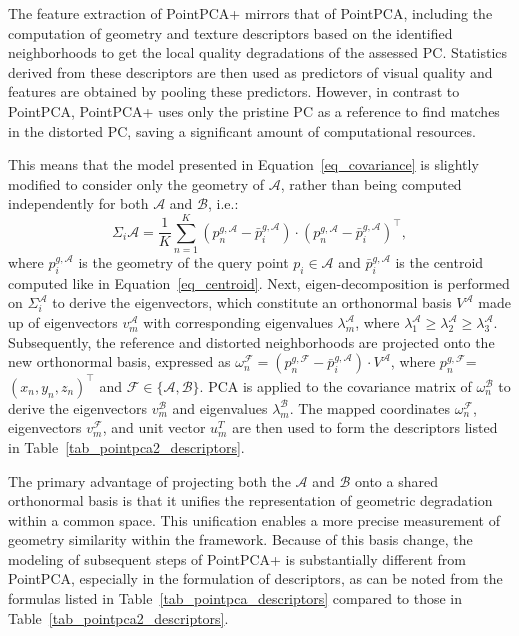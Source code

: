 \documentclass[final,3p,times,twocolumn]{elsarticle}
\begin{document}
The feature extraction of PointPCA+ mirrors that of PointPCA, including the computation of geometry and texture descriptors based on the identified neighborhoods to get the local quality degradations of the assessed \gls{PC}. Statistics derived from these descriptors are then used as predictors of visual quality and features are obtained by pooling these predictors. However, in contrast to PointPCA, PointPCA+ uses only the pristine \gls{PC} as a reference to find matches in the distorted \gls{PC}, saving a significant amount of computational resources. 

This means that the model presented in Equation~\ref{eq_covariance} is slightly modified to consider only the geometry of $\mathcal{A}$, rather than being computed independently for both $\mathcal{A}$ and $\mathcal{B}$, i.e.:
\begin{equation} \label{eq_covariance_pointpca2}
    \Sigma_i\mathcal{A} = \frac{1}{K} \sum_{n=1}^{K} \left( p_{n}^{g,\mathcal{A}} - \bar{p}_{i}^{g,\mathcal{A}} \right) \cdot \left( p_{n}^{g,\mathcal{A}} - \bar{p}_{i}^{g,\mathcal{A}} \right)^\top,
\end{equation}
where $p_{i}^{g,\mathcal{A}}$ is the geometry of the query point $p_i \in \mathcal{A}$ and $\bar{p}_{i}^{g,\mathcal{A}}$ is the centroid computed like in Equation~\ref{eq_centroid}.  Next, eigen-decomposition is performed on $\Sigma_i^\mathcal{A}$ to derive the eigenvectors, which constitute an orthonormal basis $V^\mathcal{A}$ made up of eigenvectors $v_m^{\mathcal{A}}$ with corresponding eigenvalues $\lambda_m^{\mathcal{A}}$, where $\lambda_1^{\mathcal{A}} \geq \lambda_2^{\mathcal{A}} \geq \lambda_3^{\mathcal{A}}$. Subsequently, the reference and distorted neighborhoods are projected onto the new orthonormal basis, expressed as $\omega_n^{\mathcal{F}} = \left( p_{n}^{g,\mathcal{F}} - \bar{p}_{i}^{g,\mathcal{A}} \right) \cdot V^\mathcal{A}$, where $p_n^{g, \mathcal{F}}$=$(x_n, y_n, z_n)^\top$ and $\mathcal{F} \in \{ \mathcal{A}, \mathcal{B} \}$. \gls{PCA} is applied to the covariance matrix of $\omega_n^{\mathcal{B}}$ to derive the eigenvectors $v_m^{\mathcal{B}}$ and eigenvalues $\lambda_m^{\mathcal{B}}$. The mapped coordinates $\omega_n^{\mathcal{F}}$, eigenvectors $v_m^{\mathcal{F}}$, and unit vector $u_m^T$ are then used to form the descriptors listed in Table~\ref{tab_pointpca2_descriptors}. 


The primary advantage of projecting both the $\mathcal{A}$ and $\mathcal{B}$ onto a shared orthonormal basis is that it unifies the representation of geometric degradation within a common space. This unification enables a more precise measurement of geometry similarity within the framework. Because of this basis change, the modeling of subsequent steps of PointPCA+ is substantially different from PointPCA, especially in the formulation of descriptors, as can be noted from the formulas listed in Table~\ref{tab_pointpca_descriptors} compared to those in Table~\ref{tab_pointpca2_descriptors}.
\end{document}
